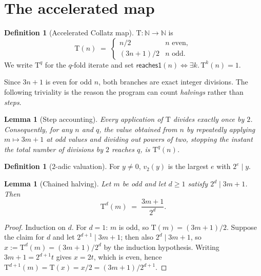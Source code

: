 \documentclass[11pt,a4paper]{article}
\theoremstyle{plain}
\newtheorem{lemma}[theorem]{Lemma}
\theoremstyle{definition}
\newtheorem{definition}[theorem]{Definition}
\newcommand{\N}{\mathbb{N}}
\newcommand{\Tmap}{\mathrm{T}}
\newcommand{\vtwo}{v_2}
\newcommand{\reaches}{\mathsf{reaches1}}
\begin{document}
\section{The accelerated map}
\label{sec:defs}

\begin{definition}[Accelerated Collatz map]
$\Tmap : \N \to \N$ is
\[
  \Tmap(n) \;=\;
  \begin{cases}
    n/2 & n \text{ even},\\[1mm]
    (3n+1)/2 & n \text{ odd}.
  \end{cases}
\]
We write $\Tmap^{q}$ for the $q$-fold iterate and set
$\reaches(n) \iff \exists k.\, \Tmap^{k}(n) = 1$.
\end{definition}

Since $3n+1$ is even for odd $n$, both branches are exact integer divisions.
The following triviality is the reason the program can count \emph{halvings}
rather than \emph{steps}.

\begin{lemma}[Step accounting]\label{lem:accounting}
Every application of $\Tmap$ divides exactly once by $2$. Consequently, for
any $n$ and $q$, the value obtained from $n$ by repeatedly applying
$m \mapsto 3m+1$ at odd values and dividing out powers of two, stopping the
instant the \emph{total} number of divisions by $2$ reaches $q$, is
$\Tmap^{q}(n)$.
\end{lemma}

\begin{definition}[$2$-adic valuation]
For $y \neq 0$, $\vtwo(y)$ is the largest $e$ with $2^{e} \mid y$.
\end{definition}

\begin{lemma}[Chained halving]\label{lem:chain}
Let $m$ be odd and let $d \geq 1$ satisfy $2^{d} \mid 3m+1$. Then
\[
  \Tmap^{d}(m) \;=\; \frac{3m+1}{2^{d}} .
\]
\end{lemma}

\begin{proof}
Induction on $d$. For $d=1$: $m$ is odd, so $\Tmap(m) = (3m+1)/2$. Suppose the
claim for $d$ and let $2^{d+1} \mid 3m+1$; then also $2^{d} \mid 3m+1$, so
$x := \Tmap^{d}(m) = (3m+1)/2^{d}$ by the induction hypothesis. Writing
$3m+1 = 2^{d+1}t$ gives $x = 2t$, which is even, hence
$\Tmap^{d+1}(m) = \Tmap(x) = x/2 = (3m+1)/2^{d+1}$.
\end{proof}
\end{document}
